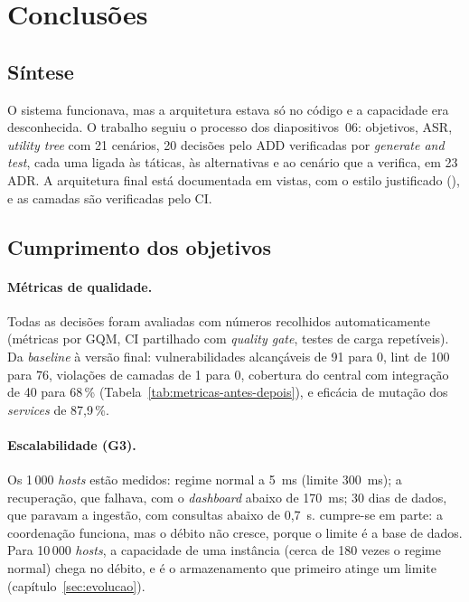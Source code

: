 \section{Conclusões}
\label{sec:conclusoes}

\subsection{Síntese}

O sistema funcionava, mas a arquitetura estava só no código e a capacidade era desconhecida. O trabalho seguiu o
processo dos diapositivos~06: objetivos, ASR, \emph{utility tree} com 21 cenários, 20 decisões pelo ADD verificadas
por \emph{generate and test}, cada uma ligada às táticas, às alternativas e ao cenário que a verifica, em 23 ADR. A
arquitetura final está documentada em vistas, com o estilo justificado (), e as camadas são verificadas
pelo CI.

\subsection{Cumprimento dos objetivos}

\paragraph{Métricas de qualidade.}
Todas as decisões foram avaliadas com números recolhidos automaticamente (métricas por GQM, CI partilhado com
\emph{quality gate}, testes de carga repetíveis). Da \emph{baseline} à versão final: vulnerabilidades alcançáveis de
91 para 0, lint de 100 para 76, violações de camadas de 1 para 0, cobertura do central com integração de 40 para
68\,\% (Tabela~\ref{tab:metricas-antes-depois}), e eficácia de mutação dos \emph{services} de 87,9\,\%.

\paragraph{Escalabilidade (G3).}
Os 1\,000 \emph{hosts} estão medidos: regime normal a 5~ms (limite 300~ms); a recuperação, que falhava, com o
\emph{dashboard} abaixo de 170~ms; 30 dias de dados, que paravam a ingestão, com consultas abaixo de 0,7~s. 
cumpre-se em parte: a coordenação funciona, mas o débito não cresce, porque o limite é a base de dados. Para 10\,000
\emph{hosts}, a capacidade de uma instância (cerca de 180 vezes o regime normal) chega no débito, e é o armazenamento
que primeiro atinge um limite (capítulo~\ref{sec:evolucao}).


